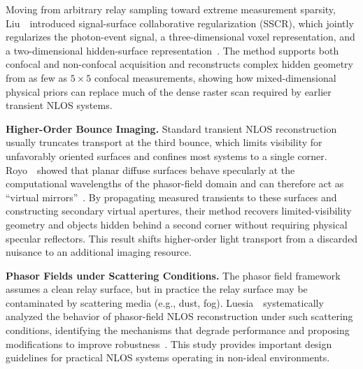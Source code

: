 Moving from arbitrary relay sampling toward extreme measurement sparsity, Liu~\etal~introduced signal-surface collaborative regularization (SSCR), which jointly regularizes the photon-event signal, a three-dimensional voxel representation, and a two-dimensional hidden-surface representation~\cite{liuFewShotSSCR2022}. The method supports both confocal and non-confocal acquisition and reconstructs complex hidden geometry from as few as $5\times5$ confocal measurements, showing how mixed-dimensional physical priors can replace much of the dense raster scan required by earlier transient NLOS systems.

\vspace{0.8mm}
\noindent \textbf{Higher-Order Bounce Imaging.}
Standard transient NLOS reconstruction usually truncates transport at the third bounce, which limits visibility for unfavorably oriented surfaces and confines most systems to a single corner. Royo~\etal~showed that planar diffuse surfaces behave specularly at the computational wavelengths of the phasor-field domain and can therefore act as ``virtual mirrors''~\cite{royoVirtualMirrors2023}. By propagating measured transients to these surfaces and constructing secondary virtual apertures, their method recovers limited-visibility geometry and objects hidden behind a second corner without requiring physical specular reflectors. This result shifts higher-order light transport from a discarded nuisance to an additional imaging resource.

\vspace{0.8mm}
\noindent \textbf{Phasor Fields under Scattering Conditions.}
The phasor field framework assumes a clean relay surface, but in practice the relay surface may be contaminated by scattering media (e.g., dust, fog). Luesia~\etal~systematically analyzed the behavior of phasor-field NLOS reconstruction under such scattering conditions, identifying the mechanisms that degrade performance and proposing modifications to improve robustness~\cite{luesiaPhaso2022}. This study provides important design guidelines for practical NLOS systems operating in non-ideal environments.


